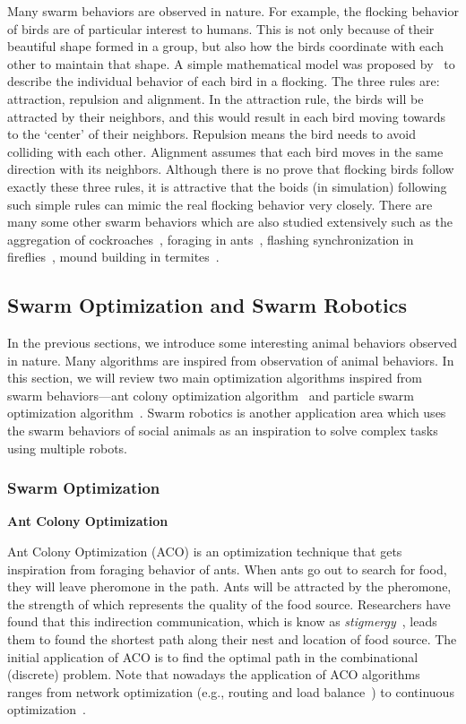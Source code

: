 Many swarm behaviors are observed in nature. For example, the flocking behavior of birds are of particular interest to humans. This is not only because of their beautiful shape formed in a group, but also how the birds coordinate with each other to maintain that shape. A simple mathematical model was proposed by~\cite{Craig:CG:1987} to describe the individual behavior of each bird in a flocking. The three rules are: attraction, repulsion and alignment. In the attraction rule, the birds will be attracted by their neighbors, and this would result in each bird moving towards to the `center' of their neighbors. Repulsion means the bird needs to avoid colliding with each other. Alignment assumes that each bird moves in the same direction with its neighbors. Although there is no prove that flocking birds follow exactly these three rules, it is attractive that the boids (in simulation) following such simple rules can mimic the real flocking behavior very closely. There are many some other swarm behaviors which are also studied extensively such as the aggregation of cockroaches~\cite{Jeanson:AB:2005}, foraging in ants~\cite{Carroll1973}, flashing synchronization in fireflies~\cite{James:ARE:1971}, mound building in termites~\cite{Bruinsma:PHD:1979}. 

\subsection{Swarm Optimization and Swarm Robotics}\label{sec:swarm_optimization_swarm_robotics}

In the previous sections, we introduce some interesting animal behaviors observed in nature. Many algorithms are inspired from observation of animal behaviors. In this section, we will review two main optimization algorithms inspired from swarm behaviors---ant colony optimization algorithm~\cite{Dorigo_1997} and particle swarm optimization algorithm~\cite{Kennedy:ICNN:1995}. Swarm robotics is another application area which uses the swarm behaviors of social animals as an inspiration to solve complex tasks using multiple robots. 

\subsubsection{Swarm Optimization}

\textbf{Ant Colony Optimization}

Ant Colony Optimization (ACO) is an optimization technique that gets inspiration from foraging behavior of ants. When ants go out to search for food, they will leave pheromone in the path. Ants will be attracted by the pheromone, the strength of which represents the quality of the food source. Researchers have found that this indirection communication, which is know as \textit{stigmergy}~\cite{Holland:AL:1999}, leads them to found the shortest path along their nest and location of food source. The initial application of ACO is to find the optimal path in the combinational (discrete) problem. Note that nowadays the application of ACO algorithms ranges from network optimization (e.g., routing and load balance~\cite{DiCaro:JAIR:1998}) to continuous optimization~\cite{Dorigo:LNCS:2004}.   

